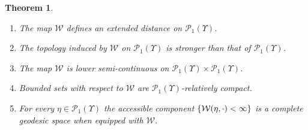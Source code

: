 \documentclass[10pt]{amsart}
\newtheorem{theorem}{Theorem}[section]
\theoremstyle{definition}
\theoremstyle{remark}
\DeclarePairedDelimiter{\set}{\lbrace}{\rbrace}
\begin{document}
\begin{theorem}\label{t:W}
\begin{enumerate}[$(\rm i)$, wide]
\item\label{i:W-extended-distance} The map $\mathcal{W}$ defines an extended distance on $\mathscr{P}_{1}(\varUpsilon)$.
\item\label{i:W-topology} The topology induced by $\mathcal{W}$ on $\mathscr{P}_{1}(\varUpsilon)$ is stronger than that of $\mathscr{P}_{1}(\varUpsilon)$.
\item\label{i:W-lsc} The map $\mathcal{W}$ is lower semi-continuous on $\mathscr{P}_{1}(\varUpsilon) \times \mathscr{P}_{1}(\varUpsilon)$.
\item\label{i:W-bounded} Bounded sets with respect to $\mathcal{W}$ are $\mathscr{P}_{1}(\varUpsilon)$-relatively compact.
\item\label{i:W-complete-geodesic} For every $\eta \in \mathscr{P}_{1}(\varUpsilon)$ the accessible component $\set*{ \mathcal{W}(\eta, \cdot) < \infty }$ is a complete geodesic space when equipped with $\mathcal{W}$.
\end{enumerate}
\end{theorem}
\end{document}
